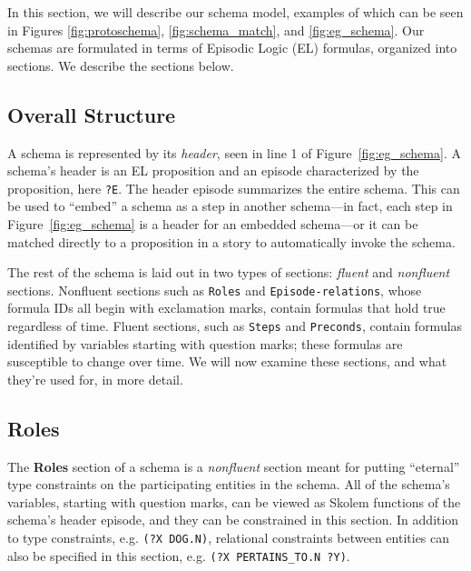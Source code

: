 In this section, we will describe our schema model, examples of which can be seen in Figures \ref{fig:protoschema}, \ref{fig:schema_match}, and \ref{fig:eg_schema}. Our schemas are formulated in terms of Episodic Logic (EL) formulas, organized into sections. We describe the sections below.

\subsection{Overall Structure}
A schema is represented by its \textit{header}, seen in line 1 of Figure~\ref{fig:eg_schema}. A schema's header is an EL proposition and an episode characterized by the proposition, here \texttt{?E}. The header episode summarizes the entire schema. This can be used to ``embed'' a schema as a step in another schema---in fact, each step in Figure~\ref{fig:eg_schema} is a header for an embedded schema---or it can be matched directly to a proposition in a story to automatically invoke the schema.

The rest of the schema is laid out in two types of sections: \textit{fluent} and \textit{nonfluent} sections. Nonfluent sections such as \texttt{Roles} and \texttt{Episode-relations}, whose formula IDs all begin with exclamation marks, contain formulas that hold true regardless of time. Fluent sections, such as \texttt{Steps} and \texttt{Preconds}, contain formulas identified by variables starting with question marks; these formulas are susceptible to change over time. We will now examine these sections, and what they're used for, in more detail.

\subsection{Roles}
The \textbf{Roles} section of a schema is a \textit{nonfluent} section meant for putting ``eternal'' type constraints on the participating entities in the schema. All of the schema's variables, starting with question marks, can be viewed as Skolem functions of the schema's header episode, and they can be constrained in this section. In addition to type constraints, e.g. \texttt{(?X DOG.N)}, relational constraints between entities can also be specified in this section, e.g. \texttt{(?X PERTAINS\_TO.N ?Y)}.

